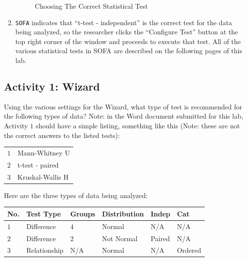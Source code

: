 \begin{enumerate}
  \begin{figure}[H]
    \begin{center}
      \caption{Choosing The Correct Statistical Test}
    \end{center}
  \end{figure}

  \item \texttt{SOFA} indicates that ``t-test - independent'' is the correct test for the data being analyzed, so the researcher clicks the ``Configure Test'' button at the top right corner of the window and proceeds to execute that test. All of the various statistical tests in SOFA are described on the following pages of this lab.

\end{enumerate}

\subsection{Activity 1: Wizard} \label{nonpara:act01}

Using the various settings for the Wizard, what type of test is recommended for the following types of data? Note: in the Word document submitted for this lab, Activity $ 1 $ should have a simple listing, something like this (Note: these are not the correct answers to the listed tests):

\begin{center}
  \begin{tabular}{ll}
    $ 1 $ & Mann-Whitney U \\ 
    $ 2 $ & t-test - paired \\ 
    $ 3 $ & Kruskal-Wallis H \\ 
  \end{tabular} 
\end{center}

Here are the three types of data being analyzed:

\begin{center}
  \begin{tabular}{llllll}
    \hline 
    \textbf{No.} & \textbf{Test Type} & \textbf{Groups} & \textbf{Distribution} & \textbf{Indep} & \textbf{Cat} \\ 
    \hline 
    $ 1 $ & Difference & $ 4 $ & Normal & N/A & N/A \\     
    $ 2 $ & Difference & $ 2 $ & Not Normal & Paired & N/A \\     
    $ 3 $ & Relationship & N/A & Normal & N/A & Ordered \\     
    \hline 
  \end{tabular} 
\end{center}

